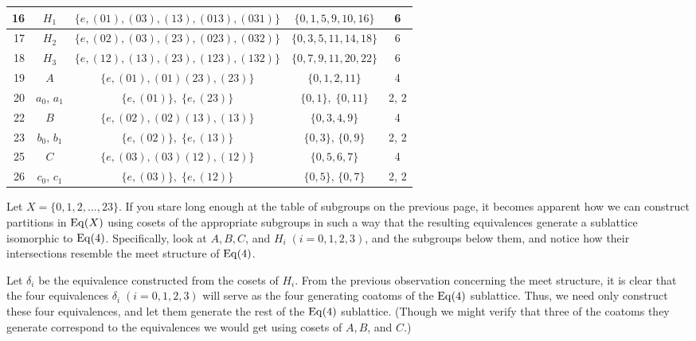 {\begin{center}
\begin{tabular}{|r|c|c|c|c|}
\hline
16&$H_1$ & $\{e, (01), (03), (13), (013), (031)\}$ & $\{0, 1, 5, 9, 10, 16\}$& 6\\[4pt]
\hline
17&$H_2$ & $\{e, (02), (03), (23), (023), (032)\}$ & $\{0, 3, 5, 11, 14, 18\}$& 6\\[4pt]
\hline
18&$H_3$ & $\{e, (12), (13), (23), (123), (132)\}$ & $\{0, 7, 9, 11, 20, 22\}$& 6\\[4pt]
\hline
19&$A$ & $\{e, (01),(01)(23),(23) \}$ & $\{0, 1, 2, 11\}$& 4 \\[4pt]
\hline
20&$a_0,\, a_1$ & $\{e, (01)\}, \; \{e, (23) \}$ & $\{0, 1\}, \;\{0, 11\}$& 2, 2 \\[4pt]
\hline
22&$B$ & $\{e, (02), (02)(13),(13)\}$ & $\{0, 3, 4, 9\}$& 4 \\[4pt]
\hline
23&$b_0,\, b_1$ & $\{e, (02)\}, \; \{e, (13)\}$ & $\{0, 3\}, \, \{0, 9\}$& 2, 2 \\[4pt]
\hline
25&$C$ & $\{e, (03), (03)(12), (12)\}$ & $\{0, 5, 6, 7\}$& 4 \\[4pt]
\hline
26&$c_0, \, c_1$ & $\{e, (03)\}, \; \{e, (12)\}$ & $\{0, 5\}, \, \{0, 7\}$& 2, 2 \\[4pt]
\hline
\end{tabular}
\end{center}
}
\newpage
Let $X = \{0, 1, 2, \ldots, 23\}$.  
If you stare long enough at the table of subgroups on the previous page, it becomes apparent
how we can construct partitions in $\operatorname{Eq}(X)$ using cosets of the appropriate subgroups
in such a way that the resulting equivalences generate a sublattice isomorphic to
$\operatorname{Eq}(4)$. Specifically, look at $A, B, C$, and $H_i \; (i=0,1,2,3)$, and the
subgroups below them, and notice how their intersections resemble the meet 
structure of $\operatorname{Eq}(4)$.  

Let $\delta_i$ be the equivalence constructed from the cosets of $H_i$.  From the
previous observation concerning the meet structure, it is clear that the
four equivalences $\delta_i \; (i=0,1,2,3)$ will serve as the four generating
coatoms of the $\operatorname{Eq}(4)$ sublattice.  Thus, we need only construct these four
equivalences, and let them generate the rest of the $\operatorname{Eq}(4)$ sublattice.
(Though we might verify that three of the coatoms they generate correspond to
the equivalences we would get using cosets of $A, B$, and $C$.)


